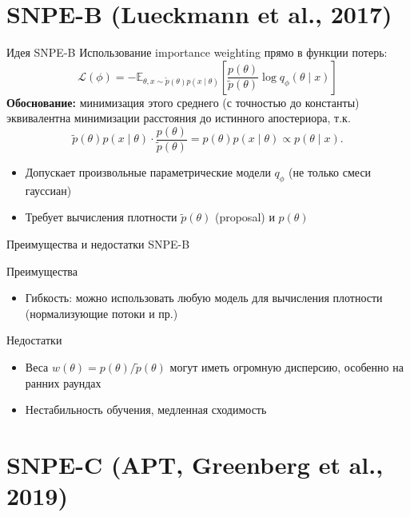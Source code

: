 \documentclass[10pt,aspectratio=169]{beamer}
\begin{document}
\section{SNPE-B (Lueckmann et al., 2017)}

\begin{frame}{Идея SNPE-B}
    Использование importance weighting прямо в функции потерь:
    \[
    \mathcal{L}(\phi) = -\mathbb{E}_{\theta,x\sim\tilde{p}(\theta)p(x\mid\theta)}\left[ \frac{p(\theta)}{\tilde{p}(\theta)} \log q_\phi(\theta\mid x) \right]
    \]
    \pause
    \textbf{Обоснование:} минимизация этого среднего (с точностью до константы) эквивалентна минимизации расстояния до истинного апостериора, т.к.
    \[
    \tilde{p}(\theta)p(x\mid\theta) \cdot \frac{p(\theta)}{\tilde{p}(\theta)} = p(\theta)p(x\mid\theta) \propto p(\theta\mid x).
    \]
    \pause
    \begin{itemize}
        \item Допускает произвольные параметрические модели $q_\phi$ (не только смеси гауссиан)
        \item Требует вычисления плотности $\tilde{p}(\theta)$ (proposal) и $p(\theta)$
    \end{itemize}
\end{frame}

\begin{frame}{Преимущества и недостатки SNPE-B}
    \begin{block}{Преимущества}
        \begin{itemize}
            \item Гибкость: можно использовать любую модель для вычисления плотности (нормализующие потоки и пр.)
        \end{itemize}
    \end{block}
    \pause
    \begin{block}{Недостатки}
        \begin{itemize}
            \item Веса $w(\theta) = p(\theta)/\tilde{p}(\theta)$ могут иметь огромную дисперсию, особенно на ранних раундах
            \item Нестабильность обучения, медленная сходимость
        \end{itemize}
    \end{block}
\end{frame}

\section{SNPE-C (APT, Greenberg et al., 2019)}
\end{document}
